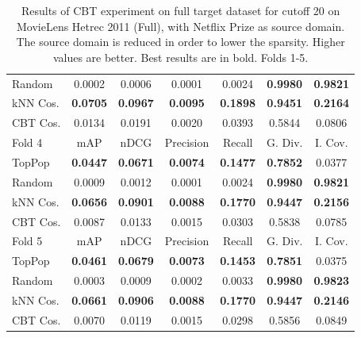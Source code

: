 \begin{table}[hbt]
\begin{tabulary}{\textwidth}{|L|CCCCCC|}
Random & 0.0002 &           0.0006 &           0.0001 &           0.0024 &                                  \textbf{0.9980} &                                   \textbf{0.9821} \\
kNN Cos. & \textbf{0.0705} &  \textbf{0.0967} &  \textbf{0.0095} &  \textbf{0.1898} &                                  \textbf{0.9451} &                                   \textbf{0.2164} \\
CBT Cos. & 0.0134 &           0.0191 &           0.0020 &           0.0393 &                                           0.5844 &                                            0.0806 \\
\hline
\hline
Fold 4 & mAP & nDCG & Precision & Recall & G. Div. & I. Cov. \\
\hline
TopPop & \textbf{0.0447} &  \textbf{0.0671} &  \textbf{0.0074} &  \textbf{0.1477} &                                  \textbf{0.7852} &                                            0.0377 \\
Random & 0.0009 &           0.0012 &           0.0001 &           0.0024 &                                  \textbf{0.9980} &                                   \textbf{0.9821} \\
kNN Cos. & \textbf{0.0656} &  \textbf{0.0901} &  \textbf{0.0088} &  \textbf{0.1770} &                                  \textbf{0.9447} &                                   \textbf{0.2156} \\
CBT Cos. & 0.0087 &           0.0133 &           0.0015 &           0.0303 &                                           0.5838 &                                            0.0785 \\
\hline
\hline
Fold 5 & mAP & nDCG & Precision & Recall & G. Div. & I. Cov. \\
\hline
TopPop & \textbf{0.0461} &  \textbf{0.0679} &  \textbf{0.0073} &  \textbf{0.1453} &                                  \textbf{0.7851} &                                            0.0375 \\
Random & 0.0003 &           0.0009 &           0.0002 &           0.0033 &                                  \textbf{0.9980} &                                   \textbf{0.9823} \\
kNN Cos. & \textbf{0.0661} &  \textbf{0.0906} &  \textbf{0.0088} &  \textbf{0.1770} &                                  \textbf{0.9447} &                                   \textbf{0.2146} \\
CBT Cos. & 0.0070 &           0.0119 &           0.0015 &           0.0298 &                                           0.5856 &                                            0.0849 \\
\hline
\end{tabulary}
\caption{Results of CBT experiment on full target dataset for cutoff 20 on MovieLens Hetrec 2011 (Full), with Netflix Prize as source domain. The source domain is reduced in order to lower the sparsity. Higher values are better. Best results are in bold. Folds 1-5.}
\end{table}

